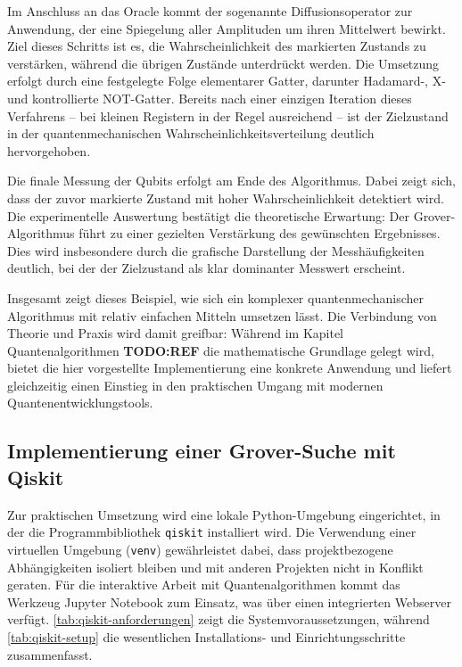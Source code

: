 Im Anschluss an das Oracle kommt der sogenannte Diffusionsoperator zur Anwendung, der eine Spiegelung aller Amplituden um ihren Mittelwert bewirkt. Ziel dieses Schritts ist es, die Wahrscheinlichkeit des markierten Zustands zu verstärken, während die übrigen Zustände unterdrückt werden. Die Umsetzung erfolgt durch eine festgelegte Folge elementarer Gatter, darunter Hadamard-, X- und kontrollierte NOT-Gatter. Bereits nach einer einzigen Iteration dieses Verfahrens – bei kleinen Registern in der Regel ausreichend – ist der Zielzustand in der quantenmechanischen Wahrscheinlichkeitsverteilung deutlich hervorgehoben.

Die finale Messung der Qubits erfolgt am Ende des Algorithmus. Dabei zeigt sich, dass der zuvor markierte Zustand mit hoher Wahrscheinlichkeit detektiert wird. Die experimentelle Auswertung bestätigt die theoretische Erwartung: Der Grover-Algorithmus führt zu einer gezielten Verstärkung des gewünschten Ergebnisses. Dies wird insbesondere durch die grafische Darstellung der Messhäufigkeiten deutlich, bei der der Zielzustand als klar dominanter Messwert erscheint.

Insgesamt zeigt dieses Beispiel, wie sich ein komplexer quantenmechanischer Algorithmus mit relativ einfachen Mitteln umsetzen lässt. Die Verbindung von Theorie und Praxis wird damit greifbar: Während im Kapitel Quantenalgorithmen \textbf{TODO:REF} die mathematische Grundlage gelegt wird, bietet die hier vorgestellte Implementierung eine konkrete Anwendung und liefert gleichzeitig einen Einstieg in den praktischen Umgang mit modernen Quantenentwicklungstools.

\subsection{Implementierung einer Grover-Suche mit Qiskit}
\label{sec:grover-implementation}

Zur praktischen Umsetzung wird eine lokale Python-Umgebung eingerichtet, in der die Programmbibliothek \texttt{qiskit} installiert wird. Die Verwendung einer virtuellen Umgebung (\texttt{venv}) gewährleistet dabei, dass projektbezogene Abhängigkeiten isoliert bleiben und mit anderen Projekten nicht in Konflikt geraten. Für die interaktive Arbeit mit Quantenalgorithmen kommt das Werkzeug Jupyter Notebook zum Einsatz, was über einen integrierten Webserver verfügt. \autoref{tab:qiskit-anforderungen} zeigt die Systemvoraussetzungen, während \autoref{tab:qiskit-setup} die wesentlichen Installations- und Einrichtungsschritte zusammenfasst.

